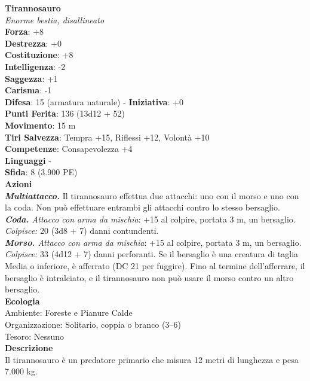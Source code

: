 \begin{multicols}{2}
\medskip\textbf{Tirannosauro}\\
\emph{Enorme bestia, disallineato}\\
\textbf{Forza}: +8\\
\textbf{Destrezza}: +0\\
\textbf{Costituzione}: +8\\
\textbf{Intelligenza}: -2\\
\textbf{Saggezza}: +1\\
\textbf{Carisma}: -1\\
\textbf{Difesa}: 15 (armatura naturale) - \textbf{Iniziativa}: +0\\
\textbf{Punti Ferita}: 136 (13d12 + 52)\\
\textbf{Movimento}: 15 m\\
\textbf{Tiri Salvezza}: Tempra +15, Riflessi +12, Volontà +10\\
\textbf{Competenze}: Consapevolezza +4\\
\textbf{Linguaggi} -\\
\textbf{Sfida}: 8 (3.900 PE)\smallskip\\
\smallskip\textbf{Azioni}\\
\emph{\textbf{Multiattacco.}} Il tirannosauro effettua due attacchi: uno con il morso e uno con la coda. Non può effettuare entrambi gli attacchi contro lo stesso bersaglio. \\
\emph{\textbf{Coda.} Attacco con arma da mischia}: +15 al colpire, portata 3 m, un bersaglio.\\
\emph{Colpisce:} 20 (3d8 + 7) danni contundenti.\\
\emph{\textbf{Morso.} Attacco con arma da mischia}: +15 al colpire, portata 3 m, un bersaglio.\\
\emph{Colpisce:} 33 (4d12 + 7) danni perforanti. Se il bersaglio è una creatura di taglia Media o inferiore, è afferrato (DC  21 per fuggire). Fino al termine dell'afferrare, il bersaglio è intralciato, e il tirannosauro non può usare il morso contro un altro bersaglio.\\
\textbf{Ecologia}\\
Ambiente: Foreste e Pianure Calde\\
Organizzazione: Solitario, coppia o branco (3–6)\\
Tesoro: Nessuno\\
\textbf{Descrizione}\\
Il tirannosauro è un predatore primario che misura 12 metri di lunghezza e pesa 7.000 kg.\\


\end{multicols}
